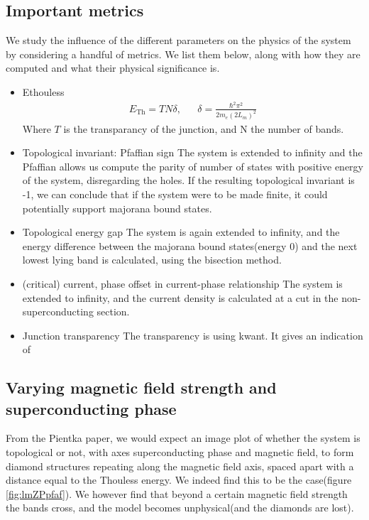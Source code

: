 \documentclass[10pt,a4paper]{article}
\begin{document}
	\subsection{Important metrics}
	We study the influence of the different parameters on the physics of the system by considering a handful of metrics. We list them below, along with how they are computed and what their physical significance is.
		\begin{itemize}
			\item \Gls{Ethouless}
				\begin{align}\label{eq:thouless}
				E_\text{Th} = TN\delta
				, && \delta = \frac{\hbar^2 \pi^2}
				{2 m_e \left( 2 L_m \right)^2}
				\end{align}
			Where $T$ is the transparancy of the junction, and N the number of bands.
			\item Topological invariant: Pfaffian sign
				\subitem The system is extended to infinity and the Pfaffian allows us compute the parity of number of states with positive energy of the system, disregarding the holes. If the resulting topological invariant is -1, we can conclude that if the system were to be made finite, it could potentially support majorana bound states.

			\item Topological energy gap
				\subitem The system is again extended to infinity, and the energy difference between the majorana bound states(energy 0) and the next lowest lying band is calculated, using the bisection method.
				
			\item (critical) current, phase offset in current-phase relationship
				\subitem The system is extended to infinity, and the current density is calculated at a cut in the non-superconducting section.
			
			\item Junction transparency
				\subitem The transparency is using kwant. It gives an indication of 
		\end{itemize}
	\subsection{Varying magnetic field strength and superconducting phase}
		From the Pientka paper, we would expect an image plot of whether the system is topological or not, with axes superconducting phase and magnetic field, to form diamond structures repeating along the magnetic field axis, spaced apart with a distance equal to the Thouless energy. We indeed find this to be the case(figure \ref{fig:lmZPpfaf}). We however find that beyond a certain magnetic field strength the bands cross, and the model becomes unphysical(and the diamonds are lost). 
		
\end{document}
